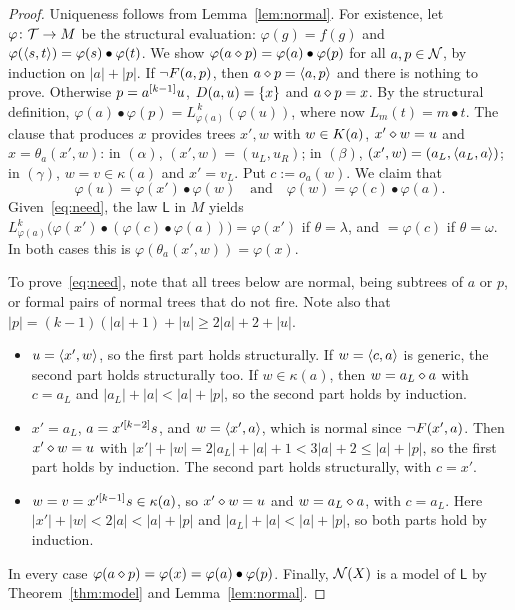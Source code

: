 \begin{proof}
Uniqueness follows from Lemma~\ref{lem:normal}. For existence, let
$\varphi\colon\mathcal{T}\to M$ be the structural evaluation:
$\varphi(g)=f(g)$ and $\varphi(\langle s,t\rangle)=\varphi(s)\bullet\varphi(t)$. We show
$\varphi(a\mathbin{\diamond} p)=\varphi(a)\bullet\varphi(p)$ for all $a,p\in\mathcal{N}$, by induction
on $|a|+|p|$. If $\neg F(a,p)$, then $a\mathbin{\diamond} p=\langle a,p\rangle$ and there is
nothing to prove. Otherwise $p=a^{[k-1]}u$, $D(a,u)=\{x\}$ and
$a\mathbin{\diamond} p=x$. By the structural definition,
$\varphi(a)\bullet\varphi(p)=L_{\varphi(a)}^{\,k}(\varphi(u))$, where now
$L_m(t)=m\bullet t$. The clause that produces $x$ provides trees $x',w$ with
$w\in K(a)$, $x'\mathbin{\diamond} w=u$ and $x=\theta_a(x',w)$: in $(\alpha)$,
$(x',w)=(u_L,u_R)$; in $(\beta)$, $(x',w)=(a_L,\langle a_L,a\rangle)$; in $(\gamma)$,
$w=v\in\kappa(a)$ and $x'=v_L$. Put $c:=o_a(w)$. We claim that
\begin{equation}\label{eq:need}
  \varphi(u)=\varphi(x')\bullet\varphi(w)\quad\text{and}\quad
  \varphi(w)=\varphi(c)\bullet\varphi(a).
\end{equation}
Given~\eqref{eq:need}, the law $\mathsf{L}$ in $M$ yields
$L^{k}_{\varphi(a)}\bigl(\varphi(x')\bullet(\varphi(c)\bullet\varphi(a))\bigr)
=\varphi(x')$ if $\theta=\lambda$, and $=\varphi(c)$ if $\theta=\omega$. In
both cases this is $\varphi(\theta_a(x',w))=\varphi(x)$.

To prove~\eqref{eq:need}, note that all trees below are normal, being subtrees
of $a$ or $p$, or formal pairs of normal trees that do not fire. Note also that
$|p|=(k-1)(|a|+1)+|u|\ge 2|a|+2+|u|$.
\begin{itemize}
\item[$(\alpha)$] $u=\langle x',w\rangle$, so the first part holds structurally. If
  $w=\langle c,a\rangle$ is generic, the second part holds structurally too. If
  $w\in\kappa(a)$, then $w=a_L\mathbin{\diamond} a$ with $c=a_L$ and
  $|a_L|+|a|<|a|+|p|$, so the second part holds by induction.
\item[$(\beta)$] $x'=a_L$, $a=x'^{[k-2]}s$, and $w=\langle x',a\rangle$, which is
  normal since $\neg F(x',a)$. Then $x'\mathbin{\diamond} w=u$ with
  $|x'|+|w|=2|a_L|+|a|+1<3|a|+2\le|a|+|p|$, so the first part holds by
  induction. The second part holds structurally, with $c=x'$.
\item[$(\gamma)$] $w=v=x'^{[k-1]}s\in\kappa(a)$, so $x'\mathbin{\diamond} w=u$ and
  $w=a_L\mathbin{\diamond} a$, with $c=a_L$. Here $|x'|+|w|<2|a|<|a|+|p|$ and
  $|a_L|+|a|<|a|+|p|$, so both parts hold by induction.
\end{itemize}
In every case $\varphi(a\mathbin{\diamond} p)=\varphi(x)=\varphi(a)\bullet\varphi(p)$.
Finally, $\mathcal{N}(X)$ is a model of $\mathsf{L}$ by Theorem~\ref{thm:model} and
Lemma~\ref{lem:normal}.
\end{proof}

